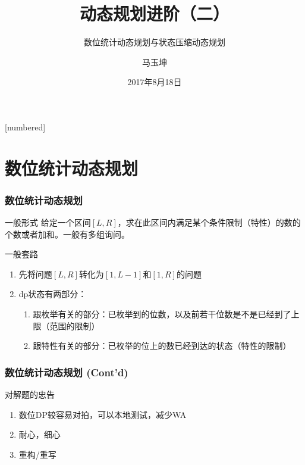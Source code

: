 \documentclass[hyperref={unicode=true}]{beamer}
\theoremstyle{definition}
\theoremstyle{proof}
\begin{document}
[numbered]
\renewcommand\figurename{图}
\renewcommand\tablename{表}
\renewcommand\contentsname{\centering 目录}


\title{动态规划进阶（二）}
\subtitle{数位统计动态规划与状态压缩动态规划}
\author{马玉坤}
\date{2017年8月18日}

\begin{frame}\titlepage\end{frame}

\section{数位统计动态规划}
\begin{frame}\frametitle{数位统计动态规划}
  \begin{block}{一般形式}
    给定一个区间$[L,R]$，求在此区间内满足某个条件限制（特性）的数的个数或者加和。一般有多组询问。
  \end{block}
  \begin{exampleblock}{一般套路}
    \begin{enumerate}[<+->]
    \item 先将问题$[L,R]$转化为$[1,L-1]$和$[1,R]$的问题
    \item dp状态有两部分：
      \begin{enumerate}
      \item 跟枚举有关的部分：已枚举到的位数，以及前若干位数是不是已经到了上限（范围的限制）
      \item 跟特性有关的部分：已枚举的位上的数已经到达的状态（特性的限制）
      \end{enumerate}
    \end{enumerate}
  \end{exampleblock}
\end{frame}
\begin{frame}\frametitle{数位统计动态规划 (Cont'd)}
  \begin{alertblock}{对解题的忠告}
    \begin{enumerate}[<+->]
    \item 数位DP较容易对拍，可以本地测试，减少WA
    \item 耐心，细心
    \item 重构/重写
    \end{enumerate}
  \end{alertblock}
\end{frame}
\end{document}
